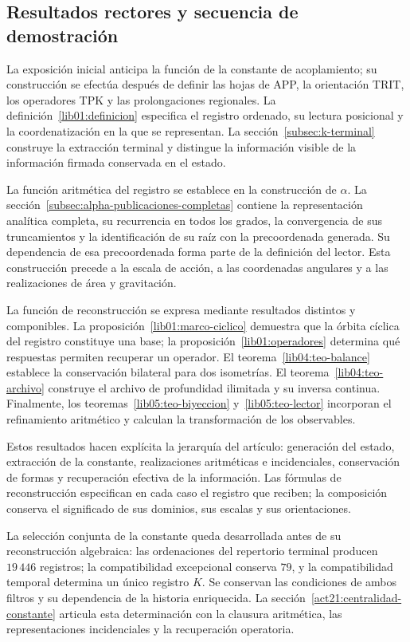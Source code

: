 \subsection*{Resultados rectores y secuencia de demostración}
\label{paper:resultados-rectores}
La exposición inicial anticipa la función de la constante de acoplamiento;
su construcción se efectúa después de definir las hojas de APP, la
orientación TRIT, los operadores TPK y las prolongaciones regionales.
La definición~\ref{lib01:definicion} especifica el registro ordenado, su
lectura posicional y la coordenatización en la que se representan. La
sección~\ref{subsec:k-terminal} construye la extracción terminal y distingue
la información visible de la información firmada conservada en el estado.

La función aritmética del registro se establece en la construcción de
\(\alpha\). La sección~\ref{subsec:alpha-publicaciones-completas} contiene
la representación analítica completa, su recurrencia en todos los grados,
la convergencia de sus truncamientos y la identificación de su raíz con la
precoordenada generada. Su dependencia de esa precoordenada forma parte de
la definición del lector. Esta construcción precede a la escala de acción,
a las coordenadas angulares y a las realizaciones de área y gravitación.

La función de reconstrucción se expresa mediante resultados distintos y
componibles. La proposición~\ref{lib01:marco-ciclico} demuestra que la
órbita cíclica del registro constituye una base; la
proposición~\ref{lib01:operadores} determina qué respuestas permiten
recuperar un operador. El teorema~\ref{lib04:teo-balance} establece la
conservación bilateral para dos isometrías. El
teorema~\ref{lib04:teo-archivo} construye el archivo de profundidad
ilimitada y su inversa continua. Finalmente, los
teoremas~\ref{lib05:teo-biyeccion} y~\ref{lib05:teo-lector} incorporan
el refinamiento aritmético y calculan la transformación de los observables.

Estos resultados hacen explícita la jerarquía del artículo: generación del
estado, extracción de la constante, realizaciones aritméticas e
incidenciales, conservación de formas y recuperación efectiva de la
información. Las fórmulas de reconstrucción especifican en cada caso el
registro que reciben; la composición conserva el significado de sus
dominios, sus escalas y sus orientaciones.

La selección conjunta de la constante queda desarrollada antes de su
reconstrucción algebraica: las ordenaciones del repertorio terminal producen
\(19\,446\) registros; la compatibilidad excepcional conserva \(79\), y la
compatibilidad temporal determina un único registro \(K\). Se conservan las
condiciones de ambos filtros y su dependencia de la historia enriquecida.
La sección~\ref{act21:centralidad-constante} articula esta determinación con
la clausura aritmética, las representaciones incidenciales y la recuperación
operatoria.
